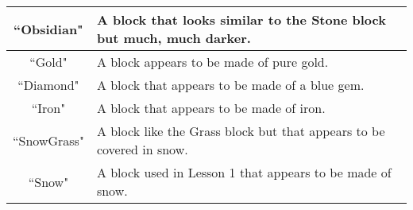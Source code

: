\documentclass{article}
\begin{document}
\begin{center}
\begin{tabular}{ | c | m{10cm} | }
 \hline
 ``Obsidian" & A block that looks similar to the Stone block but much, much darker.\\ 
 \hline
 ``Gold" & A block appears to be made of pure gold.\\ 
 \hline
 ``Diamond" & A block that appears to be made of a blue gem.\\ 
 \hline
 ``Iron" & A block that appears to be made of iron.\\ 
 \hline
 ``SnowGrass" & A block like the Grass block but that appears to be covered in snow.\\ 
 \hline
 ``Snow" & A block used in Lesson 1 that appears to be made of snow.\\ 
 \hline
\end{tabular}
\end{center}
\end{document}
